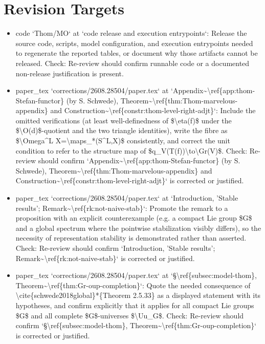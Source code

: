 \documentclass[11pt]{article}
\begin{document}
\section*{Revision Targets}
\begin{itemize}[leftmargin=*]
  \item [open] code `Thom/MO` at `code release and execution entrypoints`: Release the source code, scripts, model configuration, and execution entrypoints needed to regenerate the reported tables, or document why those artifacts cannot be released. Check: Re-review should confirm runnable code or a documented non-release justification is present.
  \item [open] paper\_tex `corrections/2608.28504/paper.tex` at `Appendix\~{}\textbackslash{}ref\{app:thom-Stefan-functor\} (by S. Schwede), Theorem\~{}\textbackslash{}ref\{thm:Thom-marvelous-appendix\} and Construction\~{}\textbackslash{}ref\{constr:thom-level-right-adjt\}`: Include the omitted verifications (at least well-definedness of \$\textbackslash{}eta(f)\$ under the \$\textbackslash{}O(d)\$-quotient and the two triangle identities), write the fibre as \$\textbackslash{}Omega\^{}L X=\textbackslash{}maps\_*(S\^{}L,X)\$ consistently, and correct the unit condition to refer to the structure map of \$q\_V(T(f))\textbackslash{}to\textbackslash{}Gr(V)\$. Check: Re-review should confirm `Appendix\~{}\textbackslash{}ref\{app:thom-Stefan-functor\} (by S. Schwede), Theorem\~{}\textbackslash{}ref\{thm:Thom-marvelous-appendix\} and Construction\~{}\textbackslash{}ref\{constr:thom-level-right-adjt\}` is corrected or justified.
  \item [open] paper\_tex `corrections/2608.28504/paper.tex` at `Introduction, 'Stable results'; Remark\~{}\textbackslash{}ref\{rk:not-naive-stab\}`: Promote the remark to a proposition with an explicit counterexample (e.g. a compact Lie group \$G\$ and a global spectrum where the pointwise stabilization visibly differs), so the necessity of representation stability is demonstrated rather than asserted. Check: Re-review should confirm `Introduction, 'Stable results'; Remark\~{}\textbackslash{}ref\{rk:not-naive-stab\}` is corrected or justified.
  \item [open] paper\_tex `corrections/2608.28504/paper.tex` at `§\textbackslash{}ref\{subsec:model-thom\}, Theorem\~{}\textbackslash{}ref\{thm:Gr-oup-completion\}`: Quote the needed consequence of \textbackslash{}cite\{schwede2018global\}*\{Theorem 2.5.33\} as a displayed statement with its hypotheses, and confirm explicitly that it applies for all compact Lie groups \$G\$ and all complete \$G\$-universes \$\textbackslash{}Uu\_G\$. Check: Re-review should confirm `§\textbackslash{}ref\{subsec:model-thom\}, Theorem\~{}\textbackslash{}ref\{thm:Gr-oup-completion\}` is corrected or justified.
\end{itemize}
\end{document}
